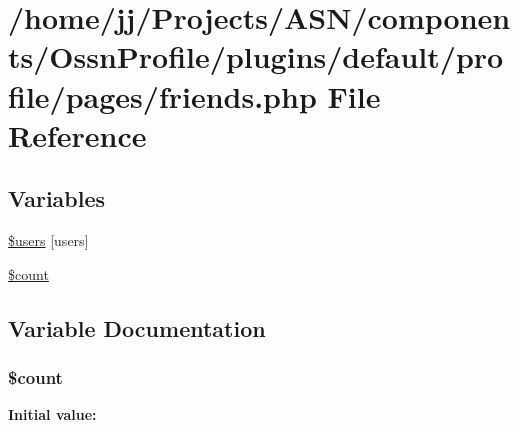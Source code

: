\hypertarget{_ossn_profile_2plugins_2default_2profile_2pages_2friends_8php}{}\section{/home/jj/\+Projects/\+A\+S\+N/components/\+Ossn\+Profile/plugins/default/profile/pages/friends.php File Reference}
\label{_ossn_profile_2plugins_2default_2profile_2pages_2friends_8php}
\subsection*{Variables}
\begin{DoxyCompactItemize}
\item 
\hyperlink{_ossn_profile_2plugins_2default_2profile_2pages_2friends_8php_a34875e196667a70f1b88c22fa728da5f}{\$users} \mbox{[}\textquotesingle{}users\textquotesingle{}\mbox{]}
\item 
\hyperlink{_ossn_profile_2plugins_2default_2profile_2pages_2friends_8php_af789423037bbc89dc7c850e761177570}{\$count}
\end{DoxyCompactItemize}


\subsection{Variable Documentation}
\subsubsection[{\texorpdfstring{\$count}{$count}}]{\setlength{\rightskip}{0pt plus 5cm}\${\bf count}}\hypertarget{_ossn_profile_2plugins_2default_2profile_2pages_2friends_8php_af789423037bbc89dc7c850e761177570}{}\label{_ossn_profile_2plugins_2default_2profile_2pages_2friends_8php_af789423037bbc89dc7c850e761177570}
{\bfseries Initial value\+:}


